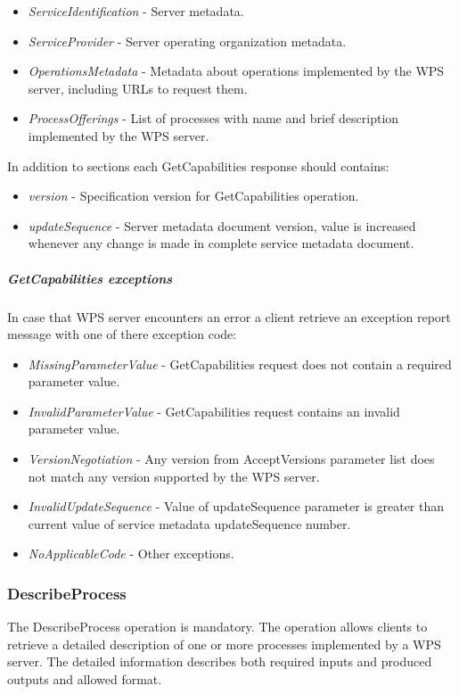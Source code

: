 \documentclass[12pt,a4paper]{article}
\begin{document}
\begin{itemize}
\item\textit{ServiceIdentification} - Server metadata.
\item\textit{ServiceProvider} - Server operating organization metadata.
\item\textit{OperationsMetadata} - Metadata about operations implemented by the WPS server, including URLs to request them.
\item\textit{ProcessOfferings} - List of processes with name and brief description implemented by the WPS server.
\end{itemize}
In addition to sections each GetCapabilities response should contains:
\begin{itemize}
\item\textit{version} - Specification version for GetCapabilities operation.
\item\textit{updateSequence} - Server metadata document version, value is increased whenever any change is made in complete service metadata document.
\end{itemize}

\subparagraph{GetCapabilities exceptions}
In case that WPS server encounters an error a client retrieve an exception report message with one of there exception code:

\begin{itemize}
\item\textit{MissingParameterValue} - GetCapabilities request does not contain a required parameter value.
\item\textit{InvalidParameterValue} - GetCapabilities request contains an invalid parameter value.
\item\textit{VersionNegotiation} - Any version from AcceptVersions parameter list does not match any version supported by the WPS server.
\item\textit{InvalidUpdateSequence} - Value of updateSequence parameter is greater than current value of service metadata updateSequence number.
\item\textit{NoApplicableCode} - Other exceptions.
\end{itemize}

\bigskip
\subsubsection{DescribeProcess}
The DescribeProcess operation is mandatory. The operation allows clients to retrieve a detailed description of one or more
processes implemented by a WPS server. The detailed information describes both required inputs and produced outputs and allowed
format.
\end{document}
